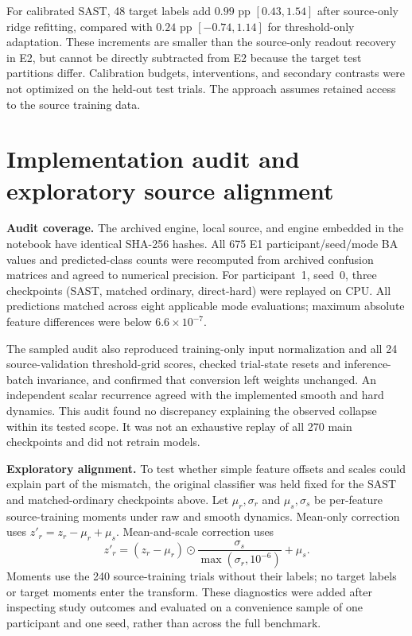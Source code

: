 \documentclass[11pt,a4paper]{article}
\begin{document}
For calibrated SAST, 48 target labels add $0.99$ pp $[0.43,1.54]$ after
source-only ridge refitting, compared with $0.24$ pp $[-0.74,1.14]$ for
threshold-only adaptation. These increments are smaller than the source-only
readout recovery in E2, but cannot be directly subtracted from E2 because
the target test partitions differ. Calibration budgets, interventions,
and secondary contrasts were not optimized on the held-out test trials.
The approach assumes retained access to the source training data.

\clearpage
\section{Implementation audit and exploratory source alignment}
\label{sec:audit}

\textbf{Audit coverage.} The archived engine, local source, and engine embedded
in the notebook have identical SHA-256 hashes. All 675 E1 participant/seed/mode
BA values and predicted-class counts were recomputed from archived confusion
matrices and agreed to numerical precision. For participant~1, seed~0,
three checkpoints (SAST, matched ordinary, direct-hard) were replayed on CPU.
All predictions matched across eight applicable mode evaluations; maximum
absolute feature differences were below $6.6\times10^{-7}$.

The sampled audit also reproduced training-only input normalization and
all 24 source-validation threshold-grid scores, checked trial-state resets
and inference-batch invariance, and confirmed that conversion left weights
unchanged. An independent scalar recurrence agreed with the implemented
smooth and hard dynamics. This audit found no discrepancy explaining the
observed collapse within its tested scope. It was not an exhaustive replay
of all 270 main checkpoints and did not retrain models.

\textbf{Exploratory alignment.} To test whether simple feature offsets and
scales could explain part of the mismatch, the original classifier was held
fixed for the SAST and matched-ordinary checkpoints above. Let $\mu_r,\sigma_r$
and $\mu_s,\sigma_s$ be per-feature source-training moments under raw and
smooth dynamics. Mean-only correction uses
$z'_r=z_r-\mu_r+\mu_s$. Mean-and-scale correction uses
\[
z'_r=(z_r-\mu_r)\odot
\frac{\sigma_s}{\max(\sigma_r,10^{-6})}+\mu_s .
\]
Moments use the 240 source-training trials without their labels; no target
labels or target moments enter the transform. These diagnostics were added
after inspecting study outcomes and evaluated on a convenience sample of
one participant and one seed, rather than across the full benchmark.
\end{document}

